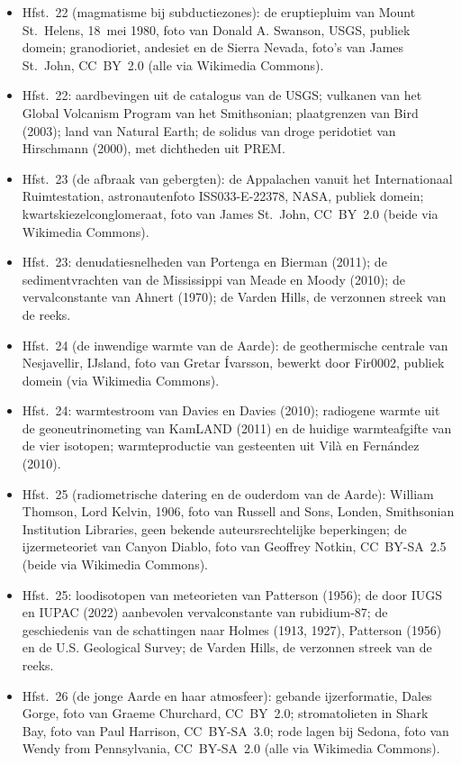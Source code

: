 \begin{itemize}
  \item Hfst.~22 (magmatisme bij subductiezones): de eruptiepluim van Mount St.~Helens, 18~mei 1980, foto van Donald A. Swanson, USGS, publiek domein; granodioriet, andesiet en de Sierra Nevada, foto's van James St.~John, CC~BY~2.0 (alle via Wikimedia Commons).
  \item Hfst.~22: aardbevingen uit de catalogus van de USGS; vulkanen van het Global Volcanism Program van het Smithsonian; plaatgrenzen van Bird (2003); land van Natural Earth; de solidus van droge peridotiet van Hirschmann (2000), met dichtheden uit PREM.
  \item Hfst.~23 (de afbraak van gebergten): de Appalachen vanuit het Internationaal Ruimtestation, astronautenfoto ISS033-E-22378, NASA, publiek domein; kwartskiezelconglomeraat, foto van James St.~John, CC~BY~2.0 (beide via Wikimedia Commons).
  \item Hfst.~23: denudatiesnelheden van Portenga en Bierman (2011); de sedimentvrachten van de Mississippi van Meade en Moody (2010); de vervalconstante van Ahnert (1970); de Varden Hills, de verzonnen streek van de reeks.
  \item Hfst.~24 (de inwendige warmte van de Aarde): de geothermische centrale van Nesjavellir, IJsland, foto van Gretar Ívarsson, bewerkt door Fir0002, publiek domein (via Wikimedia Commons).
  \item Hfst.~24: warmtestroom van Davies en Davies (2010); radiogene warmte uit de geoneutrinometing van KamLAND (2011) en de huidige warmteafgifte van de vier isotopen; warmteproductie van gesteenten uit Vilà en Fernández (2010).
  \item Hfst.~25 (radiometrische datering en de ouderdom van de Aarde): William Thomson, Lord Kelvin, 1906, foto van Russell and Sons, Londen, Smithsonian Institution Libraries, geen bekende auteursrechtelijke beperkingen; de ijzermeteoriet van Canyon Diablo, foto van Geoffrey Notkin, CC~BY-SA~2.5 (beide via Wikimedia Commons).
  \item Hfst.~25: loodisotopen van meteorieten van Patterson (1956); de door IUGS en IUPAC (2022) aanbevolen vervalconstante van rubidium-87; de geschiedenis van de schattingen naar Holmes (1913, 1927), Patterson (1956) en de U.S. Geological Survey; de Varden Hills, de verzonnen streek van de reeks.
  \item Hfst.~26 (de jonge Aarde en haar atmosfeer): gebande ijzerformatie, Dales Gorge, foto van Graeme Churchard, CC~BY~2.0; stromatolieten in Shark Bay, foto van Paul Harrison, CC~BY-SA~3.0; rode lagen bij Sedona, foto van Wendy from Pennsylvania, CC~BY-SA~2.0 (alle via Wikimedia Commons).

\end{itemize}
